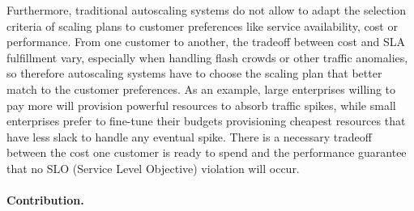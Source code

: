 
Furthermore, traditional autoscaling systems do not allow to adapt the
selection criteria of scaling plans to customer preferences like
service availability, cost or performance. From one customer to
another, the tradeoff between cost and SLA fulfillment vary,
especially when handling flash crowds or other traffic anomalies, so
therefore autoscaling systems have to choose the scaling plan that
better match to the customer preferences. As an example, large
enterprises willing to pay more will provision powerful resources to
absorb traffic spikes, while small enterprises prefer to fine-tune
their budgets provisioning cheapest resources that have less slack to
handle any eventual spike. There is a necessary tradeoff between the
cost one customer is ready to spend and the performance guarantee that
no SLO (Service Level Objective) violation will occur.







\paragraph{Contribution.}  

